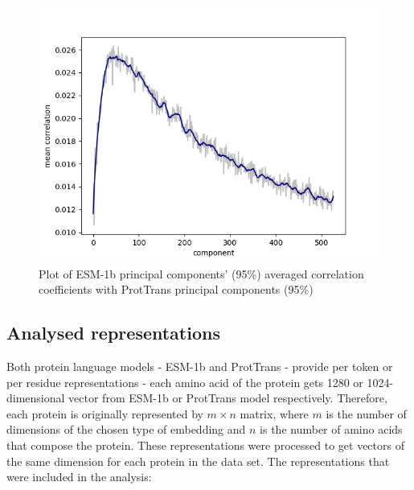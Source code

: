 \documentclass[12pt]{article}
\begin{document}
	\newpage

	\begin{figure}[h!]
		\centering
		\includegraphics[scale=0.85]{validation_small_set_2_joined_PC_95_correlation_mean.png}

		\caption{Plot of ESM-1b principal components' (95\%) averaged correlation 
		coefficients with ProtTrans principal components (95\%)}
		\label{figure:correlationComponentsMeanPC95}
	\end{figure}

	\newpage

	\subsection{Analysed representations}
	
	Both protein language models - ESM-1b and ProtTrans - provide 
	per token or per residue representations - each 
	amino acid of the protein gets 1280 or 1024-dimensional vector from
	ESM-1b or ProtTrans model respectively. Therefore, each protein is 
	originally represented by ${m \times n}$ matrix, 
	where ${m}$ is the number of dimensions of the chosen type of embedding
	and ${n}$ is the number of amino acids that compose the protein. 
	These representations were processed to get vectors of the same dimension 
	for each protein in the data set. The representations 
	that were included in the analysis:
\end{document}
